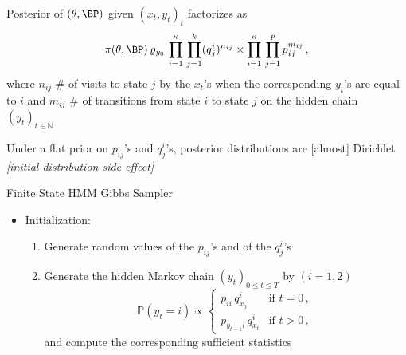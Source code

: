 \begin{slide}
Posterior of $(\theta,\BP)$ given $(x_t,y_t)_t$ factorizes as
$$
\pi(\theta,\BP)\,\varrho_{y_0}\,\prod_{i=1}^\kappa\,\prod_{j=1}^k (q^i_j)^{n_{ij}}
\times \prod_{i=1}^\kappa\,\prod_{j=1}^p p_{ij}^{m_{ij}}\,,
$$
where $n_{ij}$ $\#$ of visits to state $j$ by the $x_t$'s when
the corresponding $y_t$'s are equal to $i$ 
and $m_{ij}$ $\#$ of
transitions from state $i$ to state $j$ on the hidden chain
$(y_t)_{t\in\mathbb{N}}$

\vs\pause Under a flat prior on $p_{ij}$'s and
$q^i_j$'s, posterior distributions are [almost] Dirichlet
{\em [initial distribution side effect]}

\end{slide}\begin{slide}

\small
\begin{block}{Finite State HMM Gibbs Sampler}
\begin{itemize}
\item[]  {\sffamily Initialization:}
\begin{enumerate}
\item Generate random values of the $p_{ij}$'s and of the $q^i_j$'s
\item Generate the hidden Markov chain $(y_t)_{0\le t\le T}$ by $(i=1,2)$
$$
\mathbb{P}(y_t=i) \propto \begin{cases}
    p_{ii}\,q^i_{x_0}       &\text{if } t=0\,,\\
    p_{y_{t-1}i}\,q^i_{x_t}     &\text{if } t>0\,,
    \end{cases}
$$
and compute the corresponding sufficient statistics
\end{enumerate}
\end{itemize}
\end{block}\normalsize

\end{slide}\begin{slide}


\end{slide}
